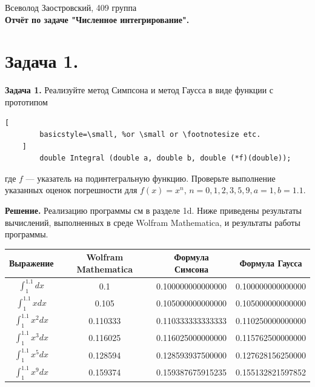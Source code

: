 \documentclass[14pt,a4paper]{extarticle}
\newcommand{\1}{\mathbbm{1}}
\begin{document}
\begin{center}

    {Всеволод Заостровский, 409 группа}\\
    {\bfseries Отчёт по задаче "Численное интегрирование".\\}
    \vspace{1cm}

\end{center}

\section{\textbf{Задача 1.}}

\textbf{Задача 1.} Реализуйте метод Симпсона и метод Гаусса в виде функции с прототипом
\begin{lstlisting}[
        basicstyle=\small, %or \small or \footnotesize etc.
    ]
        double Integral (double a, double b, double (*f)(double));
    \end{lstlisting}
где $f$ — указатель на подинтегральную функцию. Проверьте выполнение указанных оценок
погрешности для $f(x) = x^n$, ${n = 0, 1, 2, 3, 5, 9, a = 1, b = 1.1}$. \par
\textbf{Решение.}  Реализацию программы см в разделе 1d. Ниже приведены результаты вычислений, выполненных в среде Wolfram Mathematica, 
и результаты работы программы. \\
\begin{tabular}{||c c c c||} 
    \hline
    Выражение & Wolfram Mathematica & Формула Симсона & Формула Гаусса \\ [0.5ex] 
    \hline\hline
    $\int_{1}^{1.1} dx$ & 0.1 & 0.100000000000000 & 0.100000000000000 \\ 
    \hline
    $\int_{1}^{1.1} x dx$ & 0.105 & 0.105000000000000 & 0.105000000000000 \\
    \hline
    $\int_{1}^{1.1} x^2 dx$ & 0.110333 & 0.110333333333333 & 0.110250000000000 \\
    \hline
    $\int_{1}^{1.1} x^3 dx$ & 0.116025 & 0.116025000000000 & 0.115762500000000 \\
    \hline
    $\int_{1}^{1.1} x^5 dx$ & 0.128594 & 0.128593937500000 & 0.127628156250000 \\ [1ex] 
    \hline
    $\int_{1}^{1.1} x^9 dx$ & 0.159374 & 0.159387675915235 & 0.155132821597852 \\ [1ex] 
    \hline
   \end{tabular}
   
\end{document}
